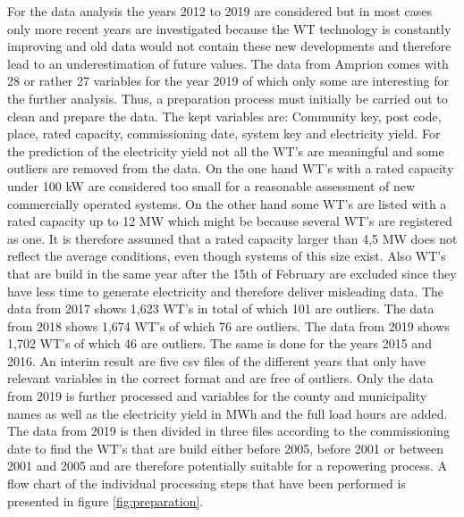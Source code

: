 \documentclass[a4paper,11pt]{article}
\begin{document}
For the data analysis the years 2012 to 2019 are considered but in most cases only more recent years are investigated because the WT technology is constantly improving and old data would not contain these new developments and therefore lead to an underestimation of future values. The data from Amprion comes with 28 or rather 27 variables for the year 2019 of which only some are interesting for the further analysis. Thus, a preparation process must initially be carried out to clean and prepare the data. The kept variables are: Community key, post code, place, rated capacity, commissioning date, system key and electricity yield. For the prediction of the electricity yield not all the WT's are meaningful and some outliers are removed from the data. On the one hand WT's with a rated capacity under 100 kW are considered too small for a reasonable assessment of new commercially operated systems. On the other hand some WT's are listed with a rated capacity up to 12 MW which might be because several WT's are registered as one. It is therefore assumed that a rated capacity larger than 4,5 MW does not reflect the average conditions, even though systems of this size exist. Also WT's that are build in the same year after the 15th of February are excluded since they have less time to generate electricity and therefore deliver misleading data. The data from 2017 shows 1,623 WT's in total of which 101 are outliers. The data from 2018 shows 1,674 WT's of which 76 are outliers. The data from 2019 shows 1,702 WT's of which 46 are outliers. The same is done for the years 2015 and 2016. An interim result are five csv files of the different years that only have relevant variables in the correct format and are free of outliers. Only the data from 2019 is further processed and variables for the county and municipality names as well as the electricity yield in MWh and the full load hours are added. The data from 2019 is then divided in three files according to the commissioning date to find the WT's that are build either before 2005, before 2001 or between 2001 and 2005 and are therefore potentially suitable for a repowering process. A flow chart of the individual processing steps that have been performed is presented in figure \ref{fig:preparation}.
\end{document}
